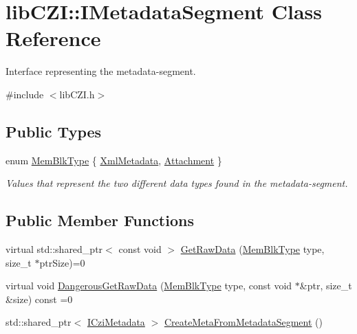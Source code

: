 \hypertarget{classlib_c_z_i_1_1_i_metadata_segment}{}\section{lib\+C\+ZI\+:\+:I\+Metadata\+Segment Class Reference}
\label{classlib_c_z_i_1_1_i_metadata_segment}


Interface representing the metadata-\/segment.  




{\ttfamily \#include $<$lib\+C\+Z\+I.\+h$>$}

\subsection*{Public Types}
\begin{DoxyCompactItemize}
\item 
enum \hyperlink{classlib_c_z_i_1_1_i_metadata_segment_a3acd5e2bf5161629f1ee56ecef9b3b72}{Mem\+Blk\+Type} \{ \hyperlink{classlib_c_z_i_1_1_i_metadata_segment_a3acd5e2bf5161629f1ee56ecef9b3b72a33f06811a574191b45596337520b8984}{Xml\+Metadata}, 
\hyperlink{classlib_c_z_i_1_1_i_metadata_segment_a3acd5e2bf5161629f1ee56ecef9b3b72a61a22550a6ebb48d975667b448757bec}{Attachment}
 \}\begin{DoxyCompactList}\small\item\em Values that represent the two different data types found in the metadata-\/segment. \end{DoxyCompactList}
\end{DoxyCompactItemize}
\subsection*{Public Member Functions}
\begin{DoxyCompactItemize}
\item 
virtual std\+::shared\+\_\+ptr$<$ const void $>$ \hyperlink{classlib_c_z_i_1_1_i_metadata_segment_a5e6fd2f7ce81245075df9bc6a522a325}{Get\+Raw\+Data} (\hyperlink{classlib_c_z_i_1_1_i_metadata_segment_a3acd5e2bf5161629f1ee56ecef9b3b72}{Mem\+Blk\+Type} type, size\+\_\+t $\ast$ptr\+Size)=0
\item 
virtual void \hyperlink{classlib_c_z_i_1_1_i_metadata_segment_a749349eab738a5fd7e5bce2e67440953}{Dangerous\+Get\+Raw\+Data} (\hyperlink{classlib_c_z_i_1_1_i_metadata_segment_a3acd5e2bf5161629f1ee56ecef9b3b72}{Mem\+Blk\+Type} type, const void $\ast$\&ptr, size\+\_\+t \&size) const =0
\item 
std\+::shared\+\_\+ptr$<$ \hyperlink{classlib_c_z_i_1_1_i_czi_metadata}{I\+Czi\+Metadata} $>$ \hyperlink{classlib_c_z_i_1_1_i_metadata_segment_a62a0e7c30613b6f4dac3bf1ca80ab8bc}{Create\+Meta\+From\+Metadata\+Segment} ()
\end{DoxyCompactItemize}



